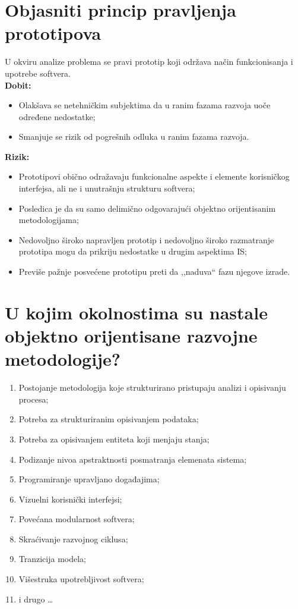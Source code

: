 \documentclass[a4paper]{article}
\begin{document}
\section{Objasniti princip pravljenja prototipova}
  U okviru analize problema se pravi prototip koji održava način funkcionisanja i upotrebe softvera.\\
  \textbf{Dobit:}
  \begin{itemize}
    \item Olakšava se netehničkim subjektima da u ranim fazama razvoja uoče određene nedostatke;
    \item Smanjuje se rizik od pogrešnih odluka u ranim fazama razvoja.
  \end{itemize}
  \textbf{Rizik:}
  \begin{itemize}
    \item Prototipovi obično odražavaju funkcionalne aspekte i elemente korisničkog interfejsa,   
          ali ne i unutrašnju strukturu softvera;
    \item Posledica je da su samo delimično odgovarajući objektno orijentisanim metodologijama;
    \item Nedovoljno široko napravljen prototip i nedovoljno široko razmatranje prototipa mogu da 
          prikriju nedostatke u drugim aspektima IS;
    \item Previše pažnje posvećene prototipu preti da ,,naduva`` fazu njegove izrade.
  \end{itemize}

\section{U kojim okolnostima su nastale objektno orijentisane razvojne metodologije?}
  \begin{enumerate}
    \item Postojanje metodologija koje strukturirano pristupaju analizi i opisivanju procesa;
    \item Potreba za strukturiranim opisivanjem podataka;
    \item Potreba za opisivanjem entiteta koji menjaju stanja;
    \item Podizanje nivoa apstraktnosti posmatranja elemenata sistema;
    \item Programiranje upravljano događajima;
    \item Vizuelni korisnički interfejsi;
    \item Povećana modularnost softvera;
    \item Skraćivanje razvojnog ciklusa;
    \item Tranzicija modela;
    \item Višestruka upotrebljivost softvera;
    \item i drugo \dots
  \end{enumerate}
\end{document}
